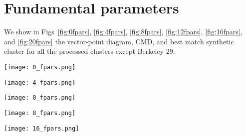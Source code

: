 \documentclass{aa}
\begin{document}
\begin{appendix}
 \begin{figure*}
  \caption{Same as Fig.~\ref{fig:BER29_struct} for KRON31, SAU6, BER56, and BER102.}
  \label{fig:20struct}
 \end{figure*}


\FloatBarrier
\section{Fundamental parameters}
 \label{app:fundam_params}

 We show in Figs~\ref{fig:0fpars}, \ref{fig:4fpars}, \ref{fig:8fpars},
 \ref{fig:12fpars}, \ref{fig:16fpars}, and \ref{fig:20fpars} the vector-point
 diagram, CMD, and best match synthetic cluster for all the processed clusters
 except Berkeley 29.

 \begin{figure*}[t]
  \centering
  \texttt{[image: 0\_fpars.png]}
  \caption{Same as Fig.~\ref{fig:BER29_fpars} for BER73, BER25, BER75, and BER26.}
  \label{fig:0fpars}
 \end{figure*}

 \begin{figure*}
  \centering
  \texttt{[image: 4\_fpars.png]}
  \caption{Same as Fig.~\ref{fig:BER29_fpars} for TOMB2, BER76, F1212, and SAU1.}
  \label{fig:4fpars}
 \end{figure*}

 \begin{figure*}
  \centering
  \texttt{[image: 0\_fpars.png]}
  \caption{Same as Fig.~\ref{fig:BER29_fpars} for CZER30, ARPM2, BH4, and F1419.}
  \label{fig:8fpars}
 \end{figure*}

 \begin{figure*}
  \centering
  \texttt{[image: 8\_fpars.png]}
  \caption{Same as Fig.~\ref{fig:BER29_fpars} for BH37, E9205, E9218, and SAU3.}
  \label{fig:12fpars}
 \end{figure*}

 \begin{figure*}
  \centering
  \texttt{[image: 16\_fpars.png]}
  \caption{Same as Fig.~\ref{fig:BER29_fpars} for KRON39, E9308, BH144, and BH176.}
  \label{fig:16fpars}
 \end{figure*}


\end{appendix}
\end{document}
